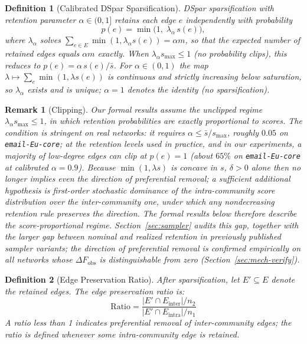 \documentclass[10pt,journal,compsoc]{IEEEtran}
\newtheorem{definition}{Definition}
\newtheorem{remark}{Remark}
\begin{document}
\begin{definition}[Calibrated DSpar Sparsification]
\label{def:calibrated}
DSpar sparsification with retention parameter $\alpha \in (0,1]$ retains each edge $e$ independently with probability
\begin{equation}
p(e) = \min\bigl(1,\; \lambda_\alpha\, s(e)\bigr),
\end{equation}
where $\lambda_\alpha$ solves $\sum_{e \in E} \min(1, \lambda_\alpha s(e)) = \alpha m$, so that the expected number of retained edges equals $\alpha m$ exactly. When $\lambda_\alpha s_{\max} \le 1$ (no probability clips), this reduces to $p(e) = \alpha\, s(e)/\bar{s}$. For $\alpha \in (0,1)$ the map $\lambda \mapsto \sum_e \min(1, \lambda s(e))$ is continuous and strictly increasing below saturation, so $\lambda_\alpha$ exists and is unique; $\alpha = 1$ denotes the identity (no sparsification).
\end{definition}

\begin{remark}[Clipping]
\label{rem:clipping}
Our formal results assume the unclipped regime $\lambda_\alpha s_{\max} \le 1$, in which retention probabilities are exactly proportional to scores. The condition is stringent on real networks: it requires $\alpha \le \bar{s}/s_{\max}$, roughly $0.05$ on \texttt{email-Eu-core}; at the retention levels used in practice, and in our experiments, a majority of low-degree edges can clip at $p(e)=1$ (about $65\%$ on \texttt{email-Eu-core} at calibrated $\alpha=0.9$). Because $\min(1,\lambda s)$ is concave in $s$, $\delta>0$ alone then no longer implies even the direction of preferential removal; a sufficient additional hypothesis is first-order stochastic dominance of the intra-community score distribution over the inter-community one, under which any nondecreasing retention rule preserves the direction. The formal results below therefore describe the score-proportional regime. Section~\ref{sec:sampler} audits this gap, together with the larger gap between nominal and realized retention in previously published sampler variants; the direction of preferential removal is confirmed empirically on all networks whose $\Delta F_{\mathrm{obs}}$ is distinguishable from zero (Section~\ref{sec:mech-verify}).
\end{remark}

\begin{definition}[Edge Preservation Ratio]
After sparsification, let $E' \subseteq E$ denote the retained edges. The \emph{edge preservation ratio} is:
\begin{equation}
\text{Ratio} = \frac{|E' \cap E_{\text{inter}}| / n_2}{|E' \cap E_{\text{intra}}| / n_1}
\end{equation}
A ratio less than 1 indicates preferential removal of inter-community edges; the ratio is defined whenever some intra-community edge is retained.
\end{definition}
\end{document}
